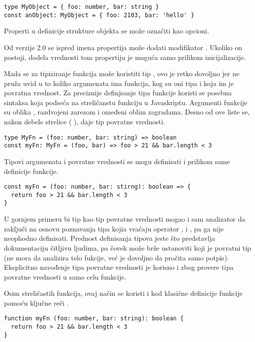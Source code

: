 \begin{verbatim}
type MyObject = { foo: number, bar: string }
const anObject: MyObject = { foo: 2103, bar: 'hello' }
\end{verbatim}

Properti u definicije strukture objekta se može označiti kao opcioni.

Od verzije 2.0 se ispred imena propertija može dodati modifikator .
Ukoliko on postoji, dodela vrednosti tom propertiju je moguća samo prilikom inicijalizacije.

Mada se za tipiziranje funkcija može koristiti tip , ovo je retko dovoljno jer ne pruža uvid u to koliko argumenata ima funkcija, kog su oni tipa i koja im je povratna vrednost.
Za preciznije definjsanje tipa funkcije koristi se posebna sintaksa koja podseća na streličanstu funkciju u Javaskriptu.
Argumenti funkcije su oblika , razdvojeni zarezom i omeđeni oblim zagradama.
Desno od ove liste se, nakon debele strelice ( \code{=>}), daje tip povratne vrednosti.

\begin{verbatim}
type MyFn = (foo: number, bar: string) => boolean
const myFn: MyFn = (foo, bar) => foo > 21 && bar.length < 3
\end{verbatim}

Tipovi argumenata i povratne vrednosti se mogu definisati i prilikom same definicije funkcije.

\begin{verbatim}
const myFn = (foo: number, bar: stirng): boolean => {
  return foo > 21 && bar.length < 3
}
\end{verbatim}

U gornjem primeru bi tip  kao tip povratne vrednosti mogao i sam analizator da zaključi na osnovu poznavanja tipa kojia vraćaju operator \code{\&\&}, \code{>} i \code{<}, pa ga nije neophodno definisati.
Prednost definisanja tipova jeste što predstavlja dokumentaciju čitljivu ljudima, pa čovek može brže ustanoviti koji je povratni tip (ne mora da analizira telo fukcije, već je dovoljno da pročita samo potpis).
Eksplicitno navođenje tipa povratne vrednosti je korisno i zbog provere tipa povratne vrednosti u samo celu funkcije.

Osim streličastih funkcija, ovaj način se koristi i kod klasične definicije funkcije pomoću ključne reči .

\begin{verbatim}
function myFn (foo: number, bar: string): boolean {
  return foo > 21 && bar.length < 3
}
\end{verbatim}

